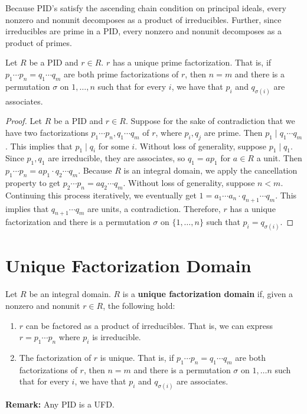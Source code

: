 \documentclass [12pt] {article}
\newenvironment{definition}[1]{\begin{tcolorbox}[title={Definition: #1},colback=blue!5!white,colframe=black!75!blue]}{\end{tcolorbox}}
\newenvironment{theorem}[1]{\begin{tcolorbox}[title={Theorem #1},colback=green!5!white,colframe=black!75!green]}{\end{tcolorbox}}
\newenvironment{corollary}[1]{\begin{tcolorbox}[title={Corollary #1}]}{\end{tcolorbox}}
\renewcommand{\bf}[1]{\textbf{{#1}}}
\begin{document}
\begin{corollary}{}
    Because PID's satisfy the ascending chain condition on principal ideals, every nonzero and
    nonunit decomposes as a product of irreducibles. Further, since irreducibles are prime in a PID,
    every nonzero and nonunit decomposes as a product of primes.
\end{corollary}

\begin{theorem}{}
    Let $R$ be a PID and $r \in R$. $r$ has a unique prime factorization. That is, if
    $p_1 \cdots p_n = q_1 \cdots q_m$ are both prime factorizations of $r$, then $n = m$ and there
    is a permutation $\sigma$ on $1, \ldots, n$ such that for every $i$, we have that $p_i$ and
    $q_{\sigma(i)}$ are associates.
\end{theorem}
\begin{proof}
    Let $R$ be a PID and $r \in R$. Suppose for the sake of contradiction that we have two
    factorizations $p_1 \cdots p_n, q_1 \cdots q_m$ of $r$, where $p_i, q_j$ are prime. Then
    $p_1 \mid q_1 \cdots q_m$. This implies that $p_1 \mid q_i$ for some $i$. Without loss of
    generality, suppose $p_1 \mid q_1$. Since $p_1, q_1$ are irreducible, they are associates, so
    $q_1 = ap_1$ for $a \in R$ a unit. Then $p_1 \cdots p_n = ap_1 \cdot q_2 \cdots q_m$. Because
    $R$ is an integral domain, we apply the cancellation property to get
    $p_2 \cdots p_n = aq_2 \cdots q_m$. Without loss of generality, suppose $n < m$. Continuing
    this process iteratively, we eventually get $1 = a_1 \cdots a_n \cdot q_{n + 1} \cdots q_m$.
    This implies that $q_{n + 1} \cdots q_m$ are units, a contradiction. Therefore, $r$ has a unique
    factorization and there is a permutation $\sigma$ on $\{1, \ldots, n\}$ such that
    $p_i = q_{\sigma(i)}$.
\end{proof}


\section{Unique Factorization Domain}

\begin{definition}{Unique Factorization Domain}
    Let $R$ be an integral domain. $R$ is a \bf{unique factorization domain} if, given a nonzero and
    nonunit $r \in R$, the following hold:

    \begin{enumerate}[label=(\arabic*)]
        \item $r$ can be factored as a product of irreducibles. That is, we can express
            $r = p_1 \cdots p_n$ where $p_i$ is irreducible.
        \item The factorization of $r$ is unique. That is, if $p_1 \cdots p_n = q_1 \cdots q_m$ are
            both factorizations of $r$, then $n = m$ and there is a permutation $\sigma$ on
            $1, \ldots n$ such that for every $i$, we have that $p_i$ and $q_{\sigma(i)}$ are
            associates.
    \end{enumerate}
\end{definition}
\bf{Remark:} Any PID is a UFD.
\vspace{1em}
\end{document}
